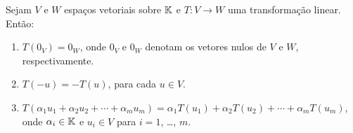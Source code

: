 \documentclass{beamer}
\begin{document}
\begin{frame}

	\begin{lema}
		Sejam $V$ e $W$ espaços vetoriais sobre $\mathbb{K}$ e $T : V \to W$ uma transformação linear. Então:
		\begin{enumerate}[label={\roman*})]\label{transformacao_linear_propriedades_basicas}
			\item $T(0_V) = 0_W$, onde $0_V$ e $0_W$ denotam os vetores nulos de $V$ e $W$, respectivamente.

			\item $T(-u) = -T(u)$, para cada $u \in V$.

			\item $T(\alpha_1u_1 + \alpha_2u_2 + \cdots + \alpha_mu_m) = \alpha_1 T(u_1) + \alpha_2 T(u_2) + \cdots + \alpha_m T(u_m)$, onde $\alpha_i \in \mathbb{K}$ e $u_i \in V$ para $i = 1$, \dots, $m$.
		\end{enumerate}
	\end{lema}
\end{frame}
\end{document}

